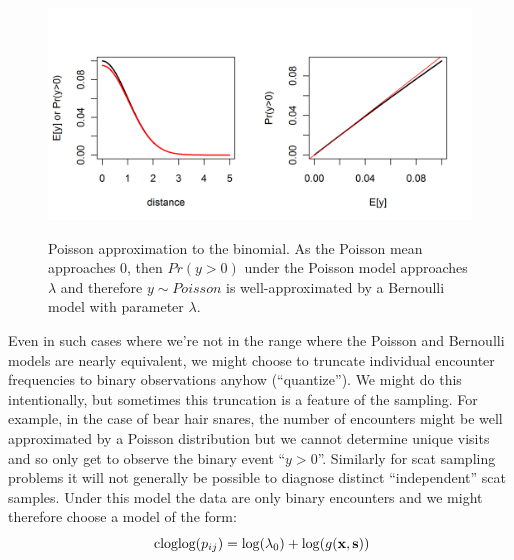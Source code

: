 \begin{figure}
\centering
\includegraphics[width=5in,height=2.5in]{Ch5-PoisMn/figs/Poisson-Bern.png}
\caption{Poisson approximation to the binomial. As the Poisson mean
  approaches 0, then $Pr(y>0)$ under the Poisson model approaches
  $\lambda$ and therefore $y \sim Poisson$ is well-approximated by a
  Bernoulli model with parameter $\lambda$.
}
\label{poisson-mn.fig.poissonbern}
\end{figure}

Even in such cases where we're not in the range where the Poisson and
Bernoulli models are nearly equivalent,
we might choose to truncate  individual encounter frequencies
to binary observations anyhow (``quantize'').
We might do
this intentionally, but sometimes this truncation is a feature of the
sampling. For example, in the case of bear hair snares, the number of
encounters might be well approximated by a Poisson distribution but we
cannot determine unique visits and so only get to observe the binary
event ``$y>0$''. Similarly for scat sampling problems it will not
generally be possible to diagnose distinct ``independent'' scat
samples. Under this model the data are only binary encounters and we
might therefore choose a model of the form:
\[
\mbox{ cloglog}(p_{ij}) = \log(\lambda_{0})  + \log(g({\bf x},{\bf s}))
\]


